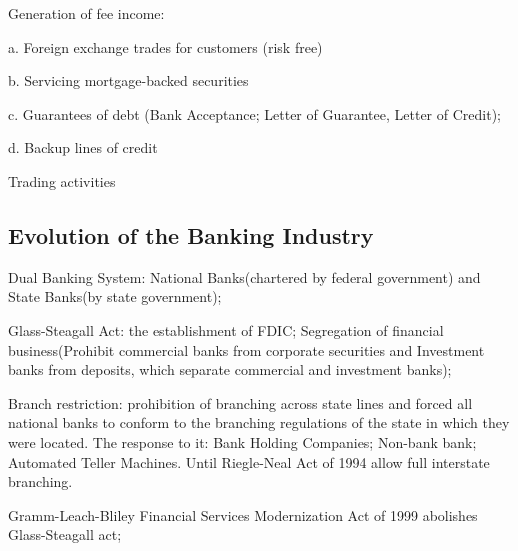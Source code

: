 \documentclass[10pt, a4paper]{article}
\begin{document}
        Generation of fee income: 
            
        \quad a. Foreign exchange trades for customers (risk free) 

        \quad b. Servicing mortgage-backed securities 

        \quad c. Guarantees of debt (Bank Acceptance; Letter of Guarantee, Letter of Credit);

        \quad d. Backup lines of credit

        Trading activities
    
    \subsection{Evolution of the Banking Industry}
        Dual Banking System: National Banks(chartered by federal government) and State Banks(by state government); 


        Glass-Steagall Act: the establishment of FDIC; Segregation of financial business(Prohibit commercial banks from corporate securities and Investment banks from deposits, which separate commercial and investment banks);
        
        Branch restriction: prohibition of branching across state lines and forced all national banks to conform to the branching regulations of the state in which they were located. The response to it: Bank Holding Companies; Non-bank  bank; Automated Teller Machines. Until Riegle-Neal Act of 1994 allow full interstate branching. 
        

        Gramm-Leach-Bliley Financial Services Modernization Act of 1999 abolishes Glass-Steagall act; 
\end{document}
